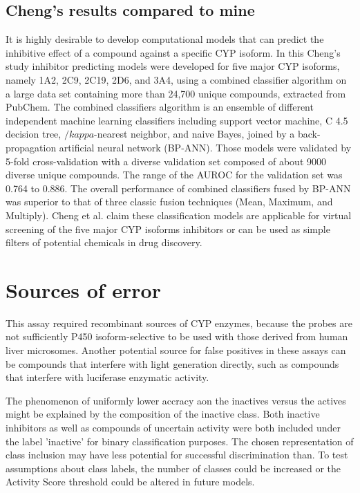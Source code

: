 \subsection{Cheng's results compared to mine}
It is highly desirable to develop computational models that can predict the inhibitive effect of a compound against a specific CYP isoform. In this Cheng's study inhibitor predicting models were developed for five major CYP isoforms, namely 1A2, 2C9, 2C19, 2D6, and 3A4, using a combined classifier algorithm on a large data set containing more than 24,700 unique compounds, extracted from PubChem. The combined classifiers algorithm is an ensemble of different independent machine learning classifiers including support vector machine, C 4.5 decision tree, $/kappa$-nearest neighbor, and naive Bayes, joined by a back-propagation artificial neural network (BP-ANN). Those models were validated by 5-fold cross-validation with a diverse validation set composed of about 9000 diverse unique compounds. The range of the AUROC for the validation set was 0.764 to 0.886. The overall performance of combined classifiers fused by BP-ANN was superior to that of three classic fusion techniques (Mean, Maximum, and Multiply). Cheng et al. claim these classification models are applicable for virtual screening of the five major CYP isoforms inhibitors or can be used as simple filters of potential chemicals in drug discovery.\cite{Cheng2011}


\section{Sources of error}
This assay required recombinant sources of CYP enzymes, because the probes are not sufficiently P450 isoform-selective to be used with those derived from human liver microsomes. Another potential source for false positives in these assays can be compounds that interfere with light generation directly, such as compounds that interfere with luciferase enzymatic activity. \cite{Zlokarnik2005}

The phenomenon of uniformly lower accracy aon the inactives versus the actives might be explained by the composition of the inactive class. Both inactive inhibitors as well as compounds of uncertain activity were both included under the label 'inactive' for binary classification purposes. The chosen representation of class inclusion may have less potential for successful discrimination than. To test assumptions about class labels, the number of classes could be increased or the Activity Score threshold could be altered in future models.



